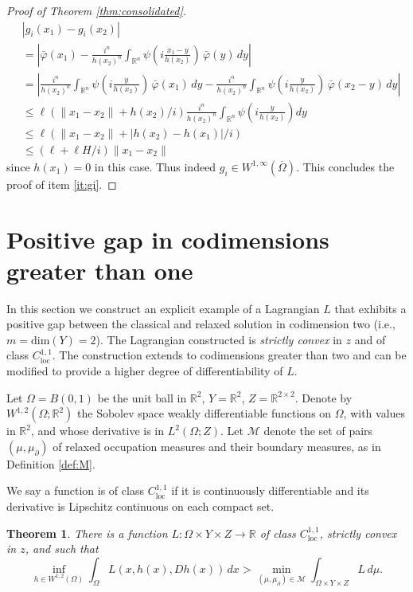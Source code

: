 \documentclass{article}
\newcommand{\R}{\mathbb{R}}
\newtheorem{theorem}{Theorem}[section]
\theoremstyle{definition}
\theoremstyle{remark}
\begin{document}
\begin{proof}[Proof of Theorem \ref{thm:consolidated}]
\begin{align*}
  &|g_i(x_1)-g_i(x_2)|\\
     &=\left|\bar\varphi(x_1)-\frac{i^n}{h(x_2)^n}\int_{\R^n}\psi\left(i\frac{x_1-y}{h(x_2)}\right)\,\bar\varphi(y)\,dy\right|\\
     &=\left|\frac{i^n}{h(x_2)^n}\int_{\R^n}\psi\left(i\frac{y}{h(x_2)}\right)\,\bar\varphi(x_1)\,dy-\frac{i^n}{h(x_2)^n}\int_{\R^n}\psi\left(i\frac{y}{h(x_2)}\right)\,\bar\varphi(x_2-y)\,dy\right|\\
     &\leq \ell(\|x_1-x_2\|+h(x_2)/i)\frac{i^n}{h(x_2)^n}\int_{\R^n}\psi\left(i\frac y{h(x_2)}\right)dy\\
     &\leq \ell(\|x_1-x_2\|+|h(x_2)-h(x_1)|/i)\\
     &\leq(\ell+\ell H/i)\|x_1-x_2\|
 \end{align*}
 since $h(x_1)=0$ in this case.
 Thus indeed $g_i\in W^{1,\infty}(\overline\Omega)$.
 This concludes the proof of item \ref{it:gi}. %
 \end{proof}


\section{Positive gap in codimensions greater than one} 
\label{sec:positive gap}
In this section we construct an explicit example of a Lagrangian $L$ that exhibits a positive gap between the classical and relaxed solution in codimension two (i.e., $ m =\mathrm{dim}(Y) = 2$). The Lagrangian constructed is \emph{strictly convex} in $z$ and of class $C^{1,1}_{\mathrm{loc}}$. The construction extends to codimensions greater than two and can be modified to provide a higher degree of differentiability of $L$.

Let $\Omega=B(0,1)$ be the unit ball in $\R^2$, $Y=\R^2$, $Z=\R^{2\times 2}$. Denote by $W^{1,2}(\Omega;\R^2)$ the Sobolev space weakly differentiable functions on $\Omega$, with values in $\R^2$, and whose derivative is in $L^2(\Omega;Z)$. Let $\mathcal M$ denote the set of pairs $(\mu,\mu_\partial)$ of relaxed occupation measures and their boundary measures, as in  Definition \ref{def:M}.%

We say a function is of class $C^{1,1}_{\mathrm{loc}}$ if it is continuously differentiable and its derivative is Lipschitz continuous on each compact set.

\begin{theorem}\label{thm:gap}
 There is a function $L\colon\Omega\times Y\times Z\to\R$ of class $C^{1,1}_{\mathrm{loc}}$, strictly convex in $z$, and such that 
 \begin{equation}\label{eq:gap}
 \inf_{h\in W^{1,2}(\Omega)}\int_{\Omega}L(x,h(x),Dh(x))\,dx>\min_{(\mu,\mu_\partial)\in\mathcal M} \int_{\Omega\times Y\times Z} L\,d\mu.
 \end{equation}
\end{theorem}
\end{document}
